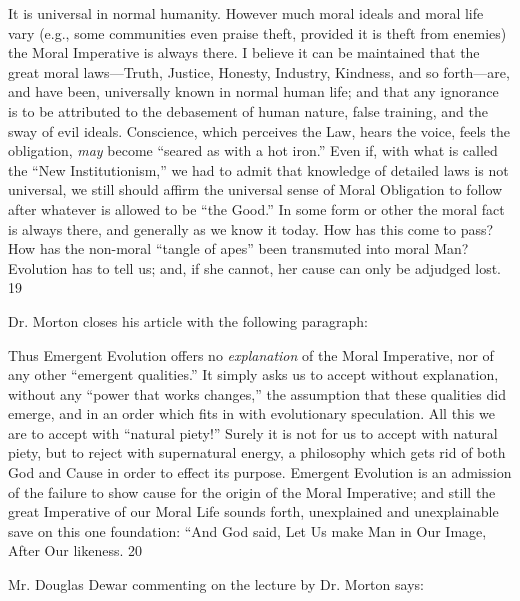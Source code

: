 It is universal in normal humanity. However much moral ideals and moral life vary (e.g.,
some communities even praise theft, provided it is theft from enemies) the Moral Imperative
is always there. I believe it can be maintained that the great moral laws—Truth, Justice,
Honesty, Industry, Kindness, and so forth—are, and have been, universally known in normal
human life; and that any ignorance is to be attributed to the debasement of human nature,
false training, and the sway of evil ideals. Conscience, which perceives the Law, hears the
voice, feels the obligation, \textit{may} become ``seared as with a hot iron.'' Even if, with what is
called the ``New Institutionism,'' we had to admit that knowledge of detailed laws is not
universal, we still should affirm the universal sense of Moral Obligation to follow after
whatever is allowed to be ``the Good.'' In some form or other the moral fact is always there,
and generally as we know it today. How has this come to pass? How has the non-moral
``tangle of apes'' been transmuted into moral Man? Evolution has to tell us; and, if she cannot,
her cause can only be adjudged lost. 19

Dr. Morton closes his article with the following paragraph:

Thus Emergent Evolution offers no \textit{explanation} of the Moral Imperative, nor of any other
``emergent qualities.'' It simply asks us to accept without explanation, without any ``power
that works changes,'' the assumption that these qualities did emerge, and in an order which
fits in with evolutionary speculation. All this we are to accept with ``natural piety!'' Surely it
is not for us to accept with natural piety, but to reject with supernatural energy, a philosophy
which gets rid of both God and Cause in order to effect its purpose. Emergent Evolution is an
admission of the failure to show cause for the origin of the Moral Imperative; and still the
great Imperative of our Moral Life sounds forth, unexplained and unexplainable save on this
one foundation: ``And God said, Let Us make Man in Our Image, After Our likeness. 20

Mr. Douglas Dewar commenting on the lecture by Dr. Morton says:

